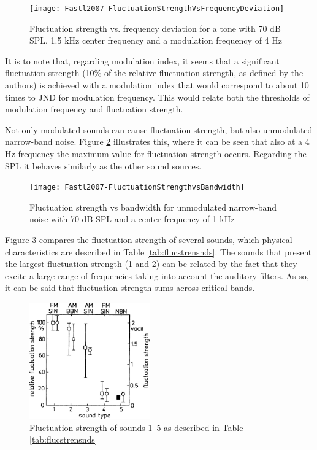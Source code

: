\begin{figure}
    \centering
    \texttt{[image: Fastl2007-FluctuationStrengthVsFrequencyDeviation]}
    \caption{Fluctuation strength vs. frequency deviation for a tone with 70 dB
        SPL, 1.5 kHz center frequency and a modulation frequency of 4 Hz
        \cite[pp. 251]{Fastl2007Psychoacoustics}}
    \label{fig:flucstrenvsfreqdev}
\end{figure}

It is to note that, regarding modulation index, it seems that a significant
fluctuation strength (10\% of the relative fluctuation strength, as defined by
the authors) is achieved with a modulation index that would correspond to about
10 times to JND for modulation frequency. This would relate both the thresholds
of modulation frequency and fluctuation strength.

Not only modulated sounds can cause fluctuation strength, but also unmodulated
narrow-band noise. Figure \ref{fig:flucstrenvsbandwith} illustrates this, where
it can be seen that also at a 4 Hz frequency the maximum value for fluctuation
strength occurs. Regarding the SPL it behaves similarly as the other sound
sources.

\begin{figure}
    \centering
    \texttt{[image: Fastl2007-FluctuationStrengthvsBandwidth]}
    \caption{Fluctuation strength vs bandwidth for unmodulated narrow-band noise
        with 70 dB SPL and a center frequency of 1 kHz
        \cite[pp. 252]{Fastl2007Psychoacoustics}}
    \label{fig:flucstrenvsbandwith}
\end{figure}

Figure \ref{fig:flucstrensnds} compares the fluctuation strength of several
sounds, which physical characteristics are described in Table
\ref{tab:flucstrensnds}. The sounds that present the largest fluctuation
strength (1 and 2) can be related by the fact that they excite a large range of
frequencies taking into account the auditory filters. As so, it can be said that
fluctuation strength sums across critical bands.

\begin{figure}
    \centering
    \includegraphics[height=5cm]
        {img/Fastl2007-FluctuationStrengthSounds.jpg}
    \caption{Fluctuation strength of sounds 1--5 as described in Table
        \ref{tab:flucstrensnds} \cite[pp. 252]{Fastl2007Psychoacoustics}}
    \label{fig:flucstrensnds}
\end{figure}

